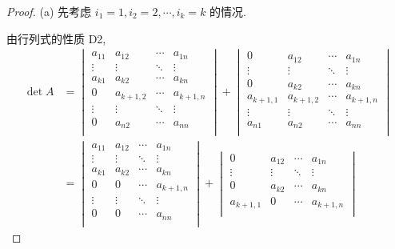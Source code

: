 \documentclass[color=black,device=normal,lang=cn,mode=geye]{elegantnote}
\begin{document}
\begin{proof}
    (a) 先考虑 $i_1=1,i_2=2,\cdots,i_k=k$ 的情况.

    由行列式的性质 D2,
    \begin{align*}
        \det A & =\begin{vmatrix}
            a_{11} & a_{12} & \cdots & a_{1n} \\
            \vdots & \vdots & \ddots & \vdots \\
            a_{k1} & a_{k2} & \cdots & a_{kn} \\
            0 & a_{k+1,2} & \cdots & a_{k+1,n} \\
            \vdots & \vdots & \ddots & \vdots \\
            0 & a_{n2} & \cdots & a_{nn} \\
        \end{vmatrix}+\begin{vmatrix}
            0 & a_{12} & \cdots & a_{1n} \\
            \vdots & \vdots & \ddots & \vdots \\
            0 & a_{k2} & \cdots & a_{kn} \\
            a_{k+1,1} & a_{k+1,2} & \cdots & a_{k+1,n} \\
            \vdots & \vdots & \ddots & \vdots \\
            a_{n1} & a_{n2} & \cdots & a_{nn} \\
        \end{vmatrix} \\
        & =\begin{vmatrix}
            a_{11} & a_{12} & \cdots & a_{1n} \\
            \vdots & \vdots & \ddots & \vdots \\
            a_{k1} & a_{k2} & \cdots & a_{kn} \\
            0 & 0 & \cdots & a_{k+1,n} \\
            \vdots & \vdots & \ddots & \vdots \\
            0 & 0 & \cdots & a_{nn} \\
        \end{vmatrix}+\begin{vmatrix}
            0 & a_{12} & \cdots & a_{1n} \\
            \vdots & \vdots & \ddots & \vdots \\
            0 & a_{k2} & \cdots & a_{kn} \\
            a_{k+1,1} & 0 & \cdots & a_{k+1,n} \\

\end{vmatrix}
\end{align*}
\end{proof}
\end{document}
